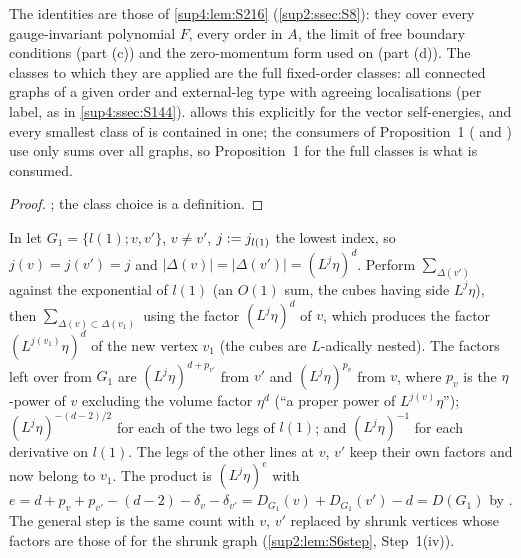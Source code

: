 \begin{lemma}\label{sup4:lem:F4}
The identities are those of \cref{sup4:lem:S216} (\cref{sup2:ssec:S8}): they cover every gauge-invariant polynomial $F$, every order in $A$, the limit of free boundary conditions (part (c)) and the zero-momentum form used on \cite[pp.~441--442]{Ba3} (part (d)). The classes to which they are applied are the full fixed-order classes: all connected graphs of a given order and external-leg type with agreeing localisations (per label, as in \cref{sup4:ssec:S144}). \cite[p.~431]{Ba3} allows this explicitly for the vector self-energies, and every smallest class of \cite[pp.~429--431]{Ba3} is contained in one; the consumers of Proposition~1 (\cite{Ba1,Ba2} and \cite{K1}) use only sums over all graphs, so Proposition~1 for the full classes is what is consumed.
\end{lemma}

\begin{proof}
; the class choice is a definition.
\end{proof}

\begin{lemma}\label{sup4:lem:F5}
In \cite[(2.14)]{Ba3} let $G_1=\{l(1);v,v'\}$, $v\ne v'$, $j:= j_{l(1)}$ the lowest index, so $j(v)=j(v')=j$ and $|\Delta(v)|=|\Delta(v')|=(L^j\eta)^d$. Perform $\sum_{\Delta(v')}$ against the exponential of $l(1)$ (an $O(1)$ sum, the cubes having side $L^j\eta$), then $\sum_{\Delta(v)\subset\Delta(v_1)}$ using the factor $(L^j\eta)^d$ of $v$, which produces the factor $(L^{j(v_1)}\eta)^d$ of the new vertex $v_1$ (the cubes are $L$-adically nested). The factors left over from $G_1$ are $(L^j\eta)^{d+p_{v'}}$ from $v'$ and $(L^j\eta)^{p_v}$ from $v$, where $p_v$ is the $\eta$-power of $v$ excluding the volume factor $\eta^d$ (``a proper power of $L^{j(v)}\eta$''); $(L^j\eta)^{-(d-2)/2}$ for each of the two legs of $l(1)$; and $(L^j\eta)^{-1}$ for each derivative on $l(1)$. The legs of the other lines at $v$, $v'$ keep their own factors and now belong to $v_1$. The product is $(L^j\eta)^e$ with $e=d+p_v+p_{v'}-(d-2)-\delta_v-\delta_{v'}=D_{G_1}(v)+D_{G_1}(v')-d=D(G_1)$ by \cite[(2.1)--(2.2)]{Ba3}. The general step \cite[(2.16)]{Ba3} is the same count with $v$, $v'$ replaced by shrunk vertices whose factors are those of \cite[(2.14)]{Ba3} for the shrunk graph (\cref{sup2:lem:S6step}, Step~1(iv)).
\end{lemma}

